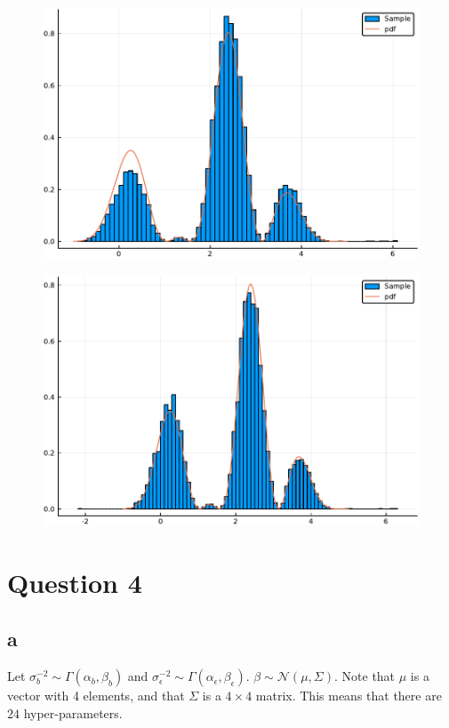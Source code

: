 \documentclass[12pt]{paper}
\newcommand{\normal}{\mathcal{N}}
\begin{document}
\begin{figure}[H]
\centering
\begin{minipage}{.5\textwidth}
  \centering
  \includegraphics[width=.8\linewidth]{pdf1.pdf}
  \label{fig:test3}
\end{minipage}%
\begin{minipage}{.5\textwidth}
  \centering
  \includegraphics[width=.8\linewidth]{pdf2.pdf}
  \label{fig:test4}
\end{minipage}
\end{figure}


\section{Question 4}
\label{sec:org667b640}
\subsection{a}
\label{sec:orgf102039}
Let $\sigma_b^{-2} \sim \Gamma(\alpha_b, \beta_b)$ and $\sigma_{\epsilon}^{-2} \sim \Gamma( \alpha_{\epsilon}, \beta_{\epsilon})$.
$\beta \sim \normal( \mu, \Sigma)$. Note that $\mu$ is a vector with 4 elements, and
that $\Sigma$ is a $4 \times 4$ matrix. This means that there are $24$
hyper-parameters. 
\end{document}
